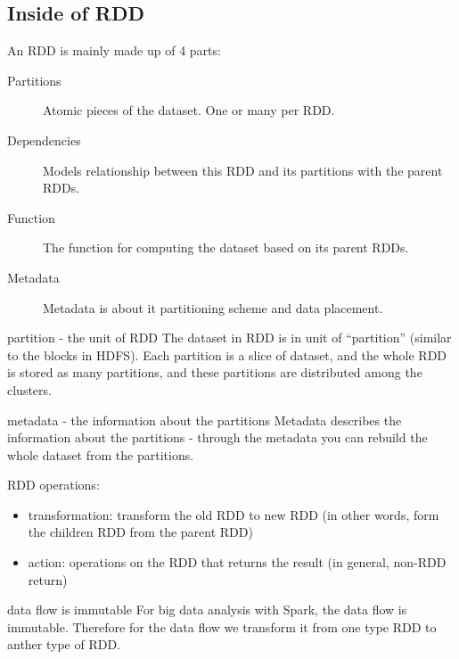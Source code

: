 \documentclass[notheorems, aspectratio=54]{beamer}
\begin{document}
\subsection{Inside of RDD}
\begin{frame}

An RDD is mainly made up of 4 parts:
\begin{description}
 \item [Partitions] Atomic pieces of the dataset. One or many per RDD.
 \item [Dependencies] Models relationship between this RDD and its partitions with the parent RDDs.
 \item [Function] The function for computing the dataset based on its parent RDDs.
 \item [Metadata] Metadata is about it partitioning scheme and data placement.
\end{description}

\end{frame}



\begin{frame}

\begin{block}{partition - the unit of RDD}
 The dataset in RDD is in unit of ``partition'' (similar to the blocks in HDFS). 
 Each partition is a slice of dataset, and the whole RDD is stored as 
 many partitions, and these partitions are distributed among the clusters.
\end{block}

\begin{block}{metadata - the information about the partitions}
 Metadata describes the information about the partitions - through the metadata you
 can rebuild the whole dataset from the partitions.
\end{block}


\end{frame}


\begin{frame}

RDD operations:
\begin{itemize}
 \item transformation: transform the old RDD to new RDD (in other words,
form the children RDD from the parent RDD)
 \item action: operations on the RDD that returns the result (in general, 
 non-RDD return)
\end{itemize}

\begin{alertblock}{data flow is immutable}
 For big data analysis with Spark, the data flow is immutable. Therefore for the data flow we transform it from one type RDD to anther type of RDD. 
\end{alertblock}

\end{frame}
\end{document}
